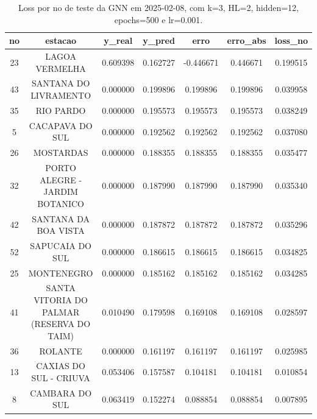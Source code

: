 \begin{table}[h]
\centering
\caption{Loss por no de teste da GNN em 2025-02-08, com k=3, HL=2, hidden=12, epochs=500 e lr=0.001.}
\label{tab:gnn_loss_k3_hl2_h12_e500_d20250208}
\begin{tabular}{ccccccc}
\toprule
no & estacao & y\_real & y\_pred & erro & erro\_abs & loss\_no \\
\midrule
23 & LAGOA VERMELHA & 0.609398 & 0.162727 & -0.446671 & 0.446671 & 0.199515 \\
43 & SANTANA DO LIVRAMENTO & 0.000000 & 0.199896 & 0.199896 & 0.199896 & 0.039958 \\
35 & RIO PARDO & 0.000000 & 0.195573 & 0.195573 & 0.195573 & 0.038249 \\
5 & CACAPAVA DO SUL & 0.000000 & 0.192562 & 0.192562 & 0.192562 & 0.037080 \\
26 & MOSTARDAS & 0.000000 & 0.188355 & 0.188355 & 0.188355 & 0.035477 \\
32 & PORTO ALEGRE - JARDIM BOTANICO & 0.000000 & 0.187990 & 0.187990 & 0.187990 & 0.035340 \\
42 & SANTANA DA BOA VISTA & 0.000000 & 0.187872 & 0.187872 & 0.187872 & 0.035296 \\
52 & SAPUCAIA DO SUL & 0.000000 & 0.186615 & 0.186615 & 0.186615 & 0.034825 \\
25 & MONTENEGRO & 0.000000 & 0.185162 & 0.185162 & 0.185162 & 0.034285 \\
41 & SANTA VITORIA DO PALMAR (RESERVA DO TAIM) & 0.010490 & 0.179598 & 0.169108 & 0.169108 & 0.028597 \\
36 & ROLANTE & 0.000000 & 0.161197 & 0.161197 & 0.161197 & 0.025985 \\
13 & CAXIAS DO SUL - CRIUVA & 0.053406 & 0.157587 & 0.104181 & 0.104181 & 0.010854 \\
8 & CAMBARA DO SUL & 0.063419 & 0.152274 & 0.088854 & 0.088854 & 0.007895 \\
\bottomrule
\end{tabular}
\end{table}
